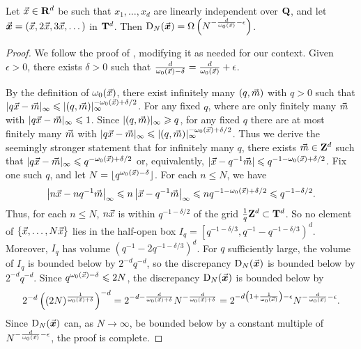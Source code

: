 \begin{theorem}\label{thm:disc-lower-bound}
Let $\vec{x}\in \mathbf{R}^d$ be such that $x_1,\dots,x_d$ are linearly independent over 
$\mathbf{Q}$, and let $\vec{\boldsymbol x}=(\vec{x},2\vec{x},3\vec{x},\dots)$ in $\mathbf{T}^d$. Then 
$\operatorname{D}_N(\vec{\boldsymbol x}) = \Omega\left(N^{-\frac{d}{\omega_0(\vec{x})}-\epsilon} \right)$. 
\end{theorem}
\begin{proof}
We follow the proof of \cite[Ch.~2, Th.~3.3]{kuipers-niederreiter-1974}, 
modifying it as needed for our context. Given $\epsilon>0$, there exists 
$\delta>0$ such that 
$\frac{d}{\omega_0(\vec{x})-\delta} = \frac{d}{\omega_0(\vec{x})} + \epsilon$. 

By the definition of $\omega_0(\vec{x})$, there exist infinitely many 
$(q,\vec{m})$ with $q>0$ such that 
$|q \vec{x} - \vec{m}|_\infty \leqslant |(q,\vec{m})|_\infty^{-\omega_0(\vec{x})+\delta/2}$. 
For any fixed $q$, where are only finitely many $\vec{m}$ with 
$|q \vec{x} - \vec{m}|_\infty \leqslant 1$. Since $|(q,\vec{m})|_\infty \geqslant q$, for 
any fixed $q$ there are at most finitely many $\vec{m}$ with 
$|q \vec{x} - \vec{m}|_\infty \leqslant |(q,\vec{m})|_\infty^{-\omega_0(\vec{x})+\delta/2}$. 
Thus we derive the seemingly stronger statement that for infinitely many $q$, 
there exists $\vec{m}\in \mathbf{Z}^d$ such that 
$|q \vec{x}-\vec{m}|_\infty \leqslant q^{-\omega_0(\vec{x})+\delta/2}$ or, equivalently, 
$|\vec{x}-q^{-1}\vec{m}| \leqslant q^{-1-\omega_0(\vec{x})+\delta/2}$. Fix one such $q$, 
and let $N=\lfloor q^{\omega_0(\vec{x})-\delta}\rfloor$. For each $n\leqslant N$, 
we have 
\[
	\left|n \vec{x} - n q^{-1} \vec{m}\right|_\infty 
		\leqslant n \left|\vec{x} - q^{-1} \vec{m}\right|_\infty
		\leqslant n q^{-1-\omega_0(\vec{x})+\delta/2}
		\leqslant q^{-1-\delta/2}. 
\]
Thus, for each $n\leqslant N$, $n \vec{x}$ is within $q^{-1-\delta/2}$ of the 
grid $\frac 1 q \mathbf{Z}^d\subset \mathbf{T}^d$. So no element of 
$\{\vec{x},\dots,N \vec{x}\}$ lies in the half-open box 
$I_q = \left[ q^{-1 - \delta / 3}, q^{-1} - q^{-1 - \delta / 3}\right)^d$. 
Moreover, $I_q$ has volume $\left(q^{-1} - 2q^{-1 - \delta / 3}\right)^d$. 
For $q$ sufficiently large, the volume of $I_q$ is bounded below by 
$2^{-d} q^{-d}$, so the discrepancy $\operatorname{D}_N(\vec{\boldsymbol x})$ is 
bounded below by $2^{-d} q^{-d}$. Since $q^{\omega_0(\vec{x})-\delta} \leqslant 2 N$, 
the discrepancy $\operatorname{D}_N(\vec{\boldsymbol x})$ is bounded below by 
\[
	2^{-d} \left( (2 N)^{\frac{1}{\omega_0(\vec{x})+\delta}}\right)^{-d} 
		= 2^{-d-\frac{d}{\omega_0(\vec{x})+\delta}} N^{-\frac{d}{\omega_0(\vec{x})+\delta}}
		= 2^{-d\left(1+\frac{1}{\omega_0(\vec{x})}\right)-\epsilon} N^{-\frac{d}{\omega_0(\vec{x})}-\epsilon} .
\]
Since $\operatorname{D}_N(\vec{\boldsymbol x})$ can, as $N\to \infty$, be bounded below by a constant 
multiple of $N^{-\frac{d}{\omega_0(\vec{x})}-\epsilon}$, the proof is complete.
\end{proof}






